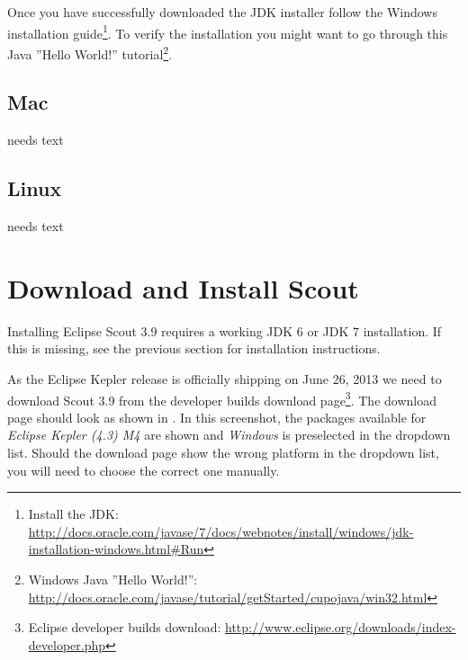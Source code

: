 \documentclass[a4paper,10pt,twoside]{book}
\begin{document}
Once you have successfully downloaded the JDK installer follow the Windows installation 
guide\footnote{Install the JDK: \url{http://docs.oracle.com/javase/7/docs/webnotes/install/windows/jdk-installation-windows.html\#Run}}.
To verify the installation you might want to go through this Java ''Hello World!'' 
tutorial\footnote{Windows Java ''Hello World!'': \url{http://docs.oracle.com/javase/tutorial/getStarted/cupojava/win32.html}}.

\subsection{Mac}
needs text

\subsection{Linux}
needs text

\section{Download and Install Scout}

Installing Eclipse Scout 3.9 requires a working JDK 6 or JDK 7 installation.
If this is missing, see the previous section for installation instructions.

As the Eclipse Kepler release is officially shipping on June 26, 2013 we need to download Scout 3.9 from the developer builds download
page\footnote{Eclipse developer builds download: \url{http://www.eclipse.org/downloads/index-developer.php}}.
The download page should look as shown in .
In this screenshot, the packages available for \textit{Eclipse Kepler (4.3) M4} are shown and \textit{Windows} is preselected in the dropdown list.
Should the download page show the wrong platform in the dropdown list, you will need to choose the correct one manually.
\end{document}
